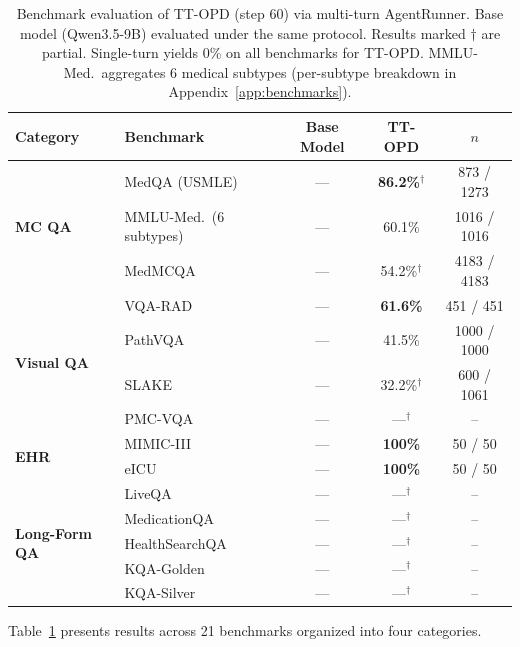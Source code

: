 \documentclass{article}
\begin{document}
\begin{table}[t]
\centering
\caption{Benchmark evaluation of TT-OPD (step 60) via multi-turn AgentRunner. Base model (Qwen3.5-9B) evaluated under the same protocol. Results marked $\dagger$ are partial. Single-turn yields 0\% on all benchmarks for TT-OPD. MMLU-Med.\ aggregates 6 medical subtypes (per-subtype breakdown in Appendix~\ref{app:benchmarks}).}
\label{tab:benchmark_multiturn}
\small
\begin{tabular}{llccc}
\toprule
\textbf{Category} & \textbf{Benchmark} & \textbf{Base Model} & \textbf{TT-OPD} & \textbf{$n$} \\
\midrule
\multirow{3}{*}{\textbf{MC QA}}
  & MedQA (USMLE) & --- & \textbf{86.2\%}$^\dagger$ & 873 / 1273 \\
  & MMLU-Med.\ (6 subtypes) & --- & 60.1\% & 1016 / 1016 \\
  & MedMCQA & --- & 54.2\%$^\dagger$ & 4183 / 4183 \\
\midrule
\multirow{4}{*}{\textbf{Visual QA}}
  & VQA-RAD & --- & \textbf{61.6\%} & 451 / 451 \\
  & PathVQA & --- & 41.5\% & 1000 / 1000 \\
  & SLAKE & --- & 32.2\%$^\dagger$ & 600 / 1061 \\
  & PMC-VQA & --- & ---$^\dagger$ & -- \\
\midrule
\multirow{2}{*}{\textbf{EHR}}
  & MIMIC-III & --- & \textbf{100\%} & 50 / 50 \\
  & eICU & --- & \textbf{100\%} & 50 / 50 \\
\midrule
\multirow{5}{*}{\textbf{Long-Form QA}}
  & LiveQA & --- & ---$^\dagger$ & -- \\
  & MedicationQA & --- & ---$^\dagger$ & -- \\
  & HealthSearchQA & --- & ---$^\dagger$ & -- \\
  & KQA-Golden & --- & ---$^\dagger$ & -- \\
  & KQA-Silver & --- & ---$^\dagger$ & -- \\
\bottomrule
\end{tabular}
\end{table}

Table~\ref{tab:benchmark_multiturn} presents results across 21 benchmarks organized into four categories.
\end{document}
